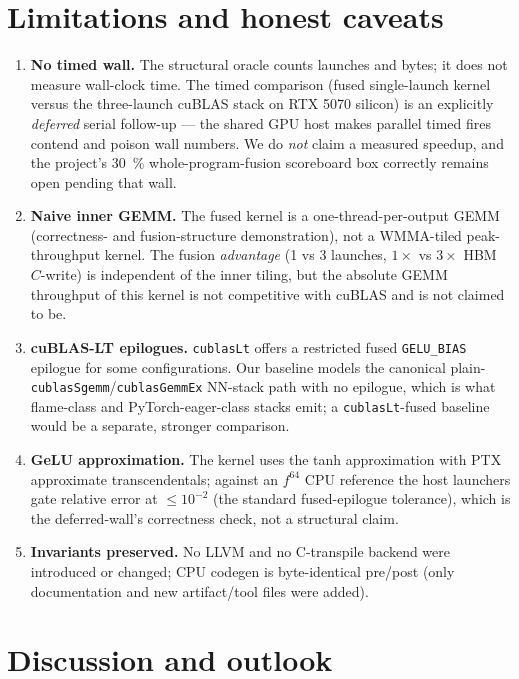 \documentclass[11pt,a4paper]{article}
\begin{document}
\section{Limitations and honest caveats}
\label{sec:limits}

\begin{enumerate}\itemsep0.3em
\item \textbf{No timed wall.} The structural oracle counts launches and bytes;
it does not measure wall-clock time. The timed comparison (fused single-launch
kernel versus the three-launch cuBLAS stack on RTX 5070 silicon) is an
explicitly \emph{deferred} serial follow-up --- the shared GPU host makes
parallel timed fires contend and poison wall numbers. We do \emph{not} claim a
measured speedup, and the project's \SI{30}{\percent} whole-program-fusion
scoreboard box correctly remains open pending that wall.
\item \textbf{Naive inner GEMM.} The fused kernel is a one-thread-per-output
GEMM (correctness- and fusion-structure demonstration), not a WMMA-tiled
peak-throughput kernel. The fusion \emph{advantage} (1 vs 3 launches, $1\times$
vs $3\times$ HBM $C$-write) is independent of the inner tiling, but the absolute
GEMM throughput of this kernel is not competitive with cuBLAS and is not
claimed to be.
\item \textbf{cuBLAS-LT epilogues.} \texttt{cublasLt} offers a restricted fused
\texttt{GELU\_BIAS} epilogue for some configurations. Our baseline models the
canonical plain-\texttt{cublasSgemm}/\texttt{cublasGemmEx} NN-stack path with no
epilogue, which is what flame-class and PyTorch-eager-class stacks emit; a
\texttt{cublasLt}-fused baseline would be a separate, stronger comparison.
\item \textbf{GeLU approximation.} The kernel uses the tanh approximation with
PTX approximate transcendentals; against an $f^{64}$ CPU reference the
host launchers gate relative error at $\leq 10^{-2}$ (the standard
fused-epilogue tolerance), which is the deferred-wall's correctness check, not
a structural claim.
\item \textbf{Invariants preserved.} No LLVM and no C-transpile backend were
introduced or changed; CPU codegen is byte-identical pre/post (only
documentation and new artifact/tool files were added).
\end{enumerate}

\section{Discussion and outlook}
\label{sec:discussion}
\end{document}
